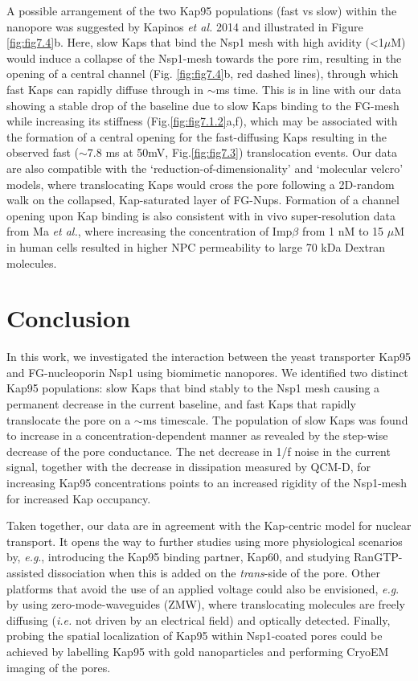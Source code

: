 A possible arrangement of the two Kap95 populations (fast vs slow) within the nanopore was suggested by Kapinos \emph{et al.} 2014\cite{Kapinos2014} and illustrated in Figure \ref{fig:fig7.4}b. Here, slow Kaps that bind the Nsp1 mesh with high avidity (<1$\mu$M) would induce a collapse of the Nsp1-mesh towards the pore rim, resulting in the opening of a central channel (Fig. \ref{fig:fig7.4}b, red dashed lines), through which fast Kaps can rapidly diffuse through in $\sim$ms time. This is in line with our data showing a stable drop of the baseline due to slow Kaps binding to the FG-mesh while increasing its stiffness (Fig.\ref{fig:fig7.1.2}a,f), which may be associated with the formation of a central opening for the fast-diffusing Kaps resulting in the observed fast ($\sim$7.8 ms at 50mV, Fig.\ref{fig:fig7.3}) translocation events. Our data are also compatible with the ‘reduction-of-dimensionality’\cite{Peters2005} and ‘molecular velcro’\cite{Schleicher2014} models, where translocating Kaps would cross the pore following a 2D-random walk on the collapsed, Kap-saturated layer of FG-Nups. Formation of a channel opening upon Kap binding is also consistent with in vivo super-resolution data from Ma \emph{et al.}\cite{Ma2012}, where increasing the concentration of Imp$\beta$ from 1 nM to 15 $\mu$M in human cells resulted in higher NPC permeability to large 70 kDa Dextran molecules. 


\section{Conclusion}
In this work, we investigated the interaction between the yeast transporter Kap95 and FG-nucleoporin Nsp1 using biomimetic nanopores. We identified two distinct Kap95 populations: slow Kaps that bind stably to the Nsp1 mesh causing a permanent decrease in the current baseline, and fast Kaps that rapidly translocate the pore on a $\sim$ms timescale. The population of slow Kaps was found to increase in a concentration-dependent manner as revealed by the step-wise decrease of the pore conductance. The net decrease in 1/f noise in the current signal, together with the decrease in dissipation measured by QCM-D, for increasing Kap95 concentrations points to an increased rigidity of the Nsp1-mesh for increased Kap occupancy. 

Taken together, our data are in agreement with the Kap-centric model for nuclear transport. It opens the way to further studies using more physiological scenarios by, \emph{e.g}., introducing the Kap95 binding partner, Kap60, and studying RanGTP-assisted dissociation when this is added on the \emph{trans}-side of the pore. Other platforms that avoid the use of an applied voltage could also be envisioned, \emph{e.g}. by using zero-mode-waveguides (ZMW\cite{Klughammer2021}), where translocating molecules are freely diffusing (\emph{i.e.} not driven by an electrical field) and optically detected. Finally, probing the spatial localization of Kap95 within Nsp1-coated pores could be achieved by labelling Kap95 with gold nanoparticles and performing CryoEM imaging of the pores.


